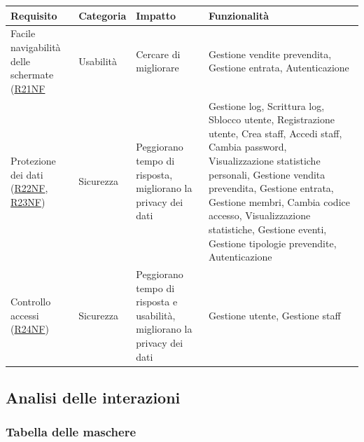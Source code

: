 \documentclass[a4paper]{article}
\begin{document}
\begin{center}
    \begin{tabularx}{1\textwidth}{|X|X|X|X|}
    \hline
    \textbf{Requisito} & \textbf{Categoria} & \textbf{Impatto} & \textbf{Funzionalità}\\
    \hline
    \hline
    Facile navigabilità delle schermate (\hyperlink{R21NF}{R21NF} & Usabilità & Cercare di migliorare & Gestione vendite prevendita,  Gestione entrata, Autenticazione\\
    \hline
    Protezione dei dati (\hyperlink{R22NF}{R22NF}, \hyperlink{R23NF}{R23NF}) & Sicurezza & Peggiorano tempo di risposta, migliorano la privacy dei dati & Gestione log, Scrittura log, Sblocco utente, Registrazione utente, Crea staff, Accedi staff, Cambia password, Visualizzazione statistiche personali, Gestione vendita prevendita, Gestione entrata, Gestione membri, Cambia codice accesso, Visualizzazione statistiche, Gestione eventi, Gestione tipologie prevendite, Autenticazione\\
    \hline
    Controllo accessi (\hyperlink{R24NF}{R24NF}) & Sicurezza & Peggiorano tempo di risposta e usabilità, migliorano la privacy dei dati & Gestione utente, Gestione staff\\
    \hline
    \end{tabularx}
\end{center}

\newpage

\subsection{Analisi delle interazioni}
\subsubsection{Tabella delle maschere}
\end{document}
